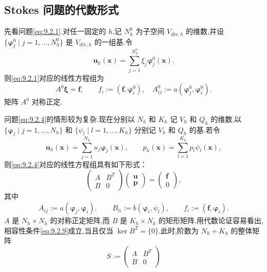 \subsection{Stokes 问题的代数形式}\label{sec:9.2.1}

先看问题\eqref{eq:9.2.1}.对任一固定的 \(h\),记 \(N_h^0\) 为子空间 \(V_{\mathrm{div},h}\) 的维数,并设 \(\{\boldsymbol{\varphi}_j^0\mid j=1,\ldots,N_h^0\}\) 是 \(V_{\mathrm{div},h}\) 的一组基.令
\[
  \boldsymbol{u}_h(\boldsymbol{x})=\sum_{j=1}^{N_h^0}\xi_j\boldsymbol{\varphi}_j^0(\boldsymbol{x}).
\]
则\eqref{eq:9.2.1}对应的线性方程组为
\[
  A^0\boldsymbol{\xi}=\boldsymbol{f},\qquad
     f_i:=(\boldsymbol{f},\boldsymbol{\varphi}_i^0),\quad
     A_{ij}^0:=a(\boldsymbol{\varphi}_j^0,\boldsymbol{\varphi}_i^0).
\]
矩阵 \(A^0\) 对称正定.

问题\eqref{eq:9.2.4}的情形较为复杂.现在分别以 \(N_h\) 和 \(K_h\) 记 \(V_h\) 和 \(Q_h\) 的维数,以 \(\{\boldsymbol{\varphi}_j\mid j=1,\ldots,N_h\}\) 和 \(\{\psi_l\mid l=1,\ldots,K_h\}\) 分别记 \(V_h\) 和 \(Q_h\) 的基.若令
\[
  \boldsymbol{u}_h(\boldsymbol{x})=\sum_{j=1}^{N_h}u_j\boldsymbol{\varphi}_j(\boldsymbol{x}),\qquad
  p_h(\boldsymbol{x})=\sum_{l=1}^{K_h}p_l\psi_l(\boldsymbol{x}),
\]
则\eqref{eq:9.2.4}对应的线性方程组具有如下形式：
\begin{equation}\label{eq:9.2.14}
  \begin{pmatrix}A&B^T\\B&0\end{pmatrix}
    \begin{pmatrix}\boldsymbol{u}\\\boldsymbol{p}\end{pmatrix}
       =\begin{pmatrix}\boldsymbol{f}\\0\end{pmatrix},
\end{equation}
其中
\begin{equation}\label{eq:9.2.15}
  A_{ij}:=a(\boldsymbol{\varphi}_j,\boldsymbol{\varphi}_i),\qquad
  B_{li}:=b(\boldsymbol{\varphi}_i,\psi_l),\qquad f_i:=(\boldsymbol{f},\boldsymbol{\varphi}_i).
\end{equation}
\(A\) 是 \(N_h\times N_h\) 的对称正定矩阵,而 \(B\) 是 \(K_h\times N_h\) 的矩形矩阵.用代数论证容易看出,相容性条件\eqref{eq:9.2.9}成立,当且仅当 \(\ker B^T=\{0\}\).此时,阶数为 \(N_h+K_h\) 的整体矩阵
\begin{equation}\label{eq:9.2.16}
  S:=\begin{pmatrix}A&B^T\\B&0\end{pmatrix}
\end{equation}
